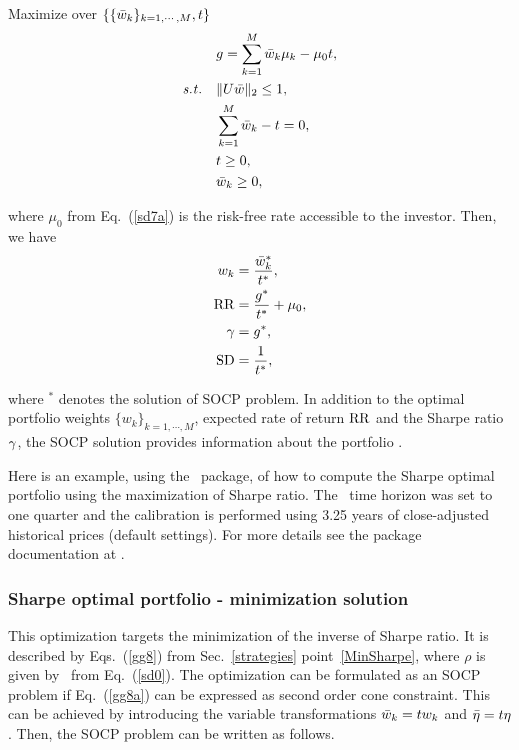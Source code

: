 \bigskip
\noindent Maximize over $\{ \{{\bar w}_k\}_{k=1,\cdots,M}, t\}$
\begin{subequations}\label{sd7}
\begin{align}
    & g = \sum_{k=1}^M \bw_k \mu_k - \mu_0 t, \label{sd7a} \\
    \st & \| U \bw \|_2 \leq 1, \label{sd7b} \\
        & \sum_{k=1}^M \bw_k - t = 0, \label{sd7c} \\
        & t \geq 0, \label{sd7e} \\
        & \bw_k \geq 0, \label{sd7d}
\end{align}
\end{subequations}

\noindent where $\mu_0$ from Eq.~(\ref{sd7a}) is the risk-free rate accessible to the investor.
Then, we have
\begin{subequations}\label{sd8}
\begin{align}
    w_k &= \frac{\bw_k^*}{t^*}, \label{sd8a} \\
    \RR &= \frac{g^*}{t^*} + \mu_0, \label{sd8c} \\
    \Sharpe &= g^*, \label{sd8b} \\
    \SD &= \frac{1}{t^*}, \label{sd8d}
\end{align}
\end{subequations}

\noindent where $^*$ denotes the solution of SOCP problem.
In addition to the optimal portfolio weights $\{w_k\}_{k=1,\cdots,M}$, expected rate of return ${\rm RR}$ and
the Sharpe ratio ${\gamma}$,
the SOCP solution provides information about the portfolio \SD.


\bigskip
\noindent Here is an example, using the \azapy\ package, of how to compute the Sharpe optimal portfolio using the maximization
of Sharpe ratio.
The \SD\ time horizon was set to one quarter and the calibration is performed using 3.25 years of
close-adjusted historical prices (default settings).
For more details see the package documentation at \azapydoc.



\BackToContents


\subsubsection{Sharpe optimal portfolio - minimization solution}
This optimization targets the minimization of the inverse of Sharpe ratio.
It is  described by Eqs.~(\ref{gg8}) from Sec.~\ref{strategies} point~\ref{MinSharpe}, where
$\rho$ is given by \SD\ from Eq.~(\ref{sd0}).
The optimization can be formulated as an SOCP problem if Eq.~(\ref{gg8a}) can be expressed as second order cone constraint. This can be achieved by
introducing the  variable transformations
${\bar w}_k = t w_k$ and ${\bar \eta} = t\eta$.
Then, the SOCP problem can be written as follows.

